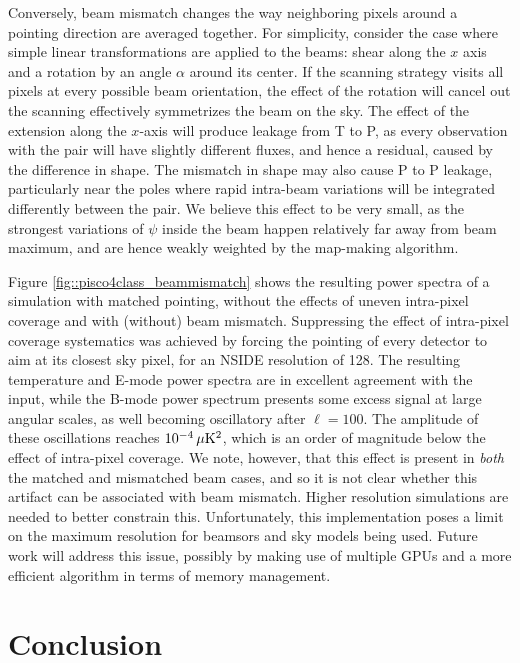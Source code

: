 \documentclass[a4paper,11pt]{article}
\begin{document}
Conversely, beam mismatch changes the way neighboring pixels around a pointing direction are averaged together. For simplicity, consider the case where simple linear transformations are applied to the beams: shear along the $x$ axis and a rotation by an angle $\alpha$ around its center. If the scanning strategy visits all pixels at every possible beam orientation, the effect of the rotation will cancel out the scanning effectively symmetrizes the beam on the sky. The effect of the extension along the $x$-axis will produce leakage from T to P, as every observation with the pair will have slightly different fluxes, and hence a residual, caused by the difference in shape. The mismatch in shape may also cause P to P leakage, particularly near the poles where rapid intra-beam variations will be integrated differently between the pair. We believe this effect to be very small, as the strongest variations of $\psi$ inside the beam happen relatively far away from beam maximum, and are hence weakly weighted by the map-making algorithm.

Figure \ref{fig::pisco4class_beammismatch} shows the resulting power spectra of a simulation with matched pointing, without the effects of uneven intra-pixel coverage and with (without) beam mismatch. Suppressing the effect of intra-pixel coverage systematics was achieved by forcing the pointing of every detector to aim at its closest sky pixel, for an NSIDE resolution of 128. The resulting temperature and E-mode power spectra are in excellent agreement with the input, while the B-mode power spectrum presents some excess signal at large angular scales, as well becoming oscillatory after $\ell=100$. The amplitude of these oscillations reaches $10^{-4} \, \mu\rm{K}^2$, which is an order of magnitude below the effect of intra-pixel coverage. We note, however, that this effect is present in \textsl{both} the matched and mismatched beam cases, and so it is not clear whether this artifact can be associated with beam mismatch. Higher resolution simulations are needed to better constrain this. Unfortunately, this implementation poses a limit on the maximum resolution for beamsors and sky models being used. Future work will address this issue, possibly by making use of multiple GPUs and a more efficient algorithm in terms of memory management.

\section{Conclusion}
\label{sec::conclusions}
\end{document}

